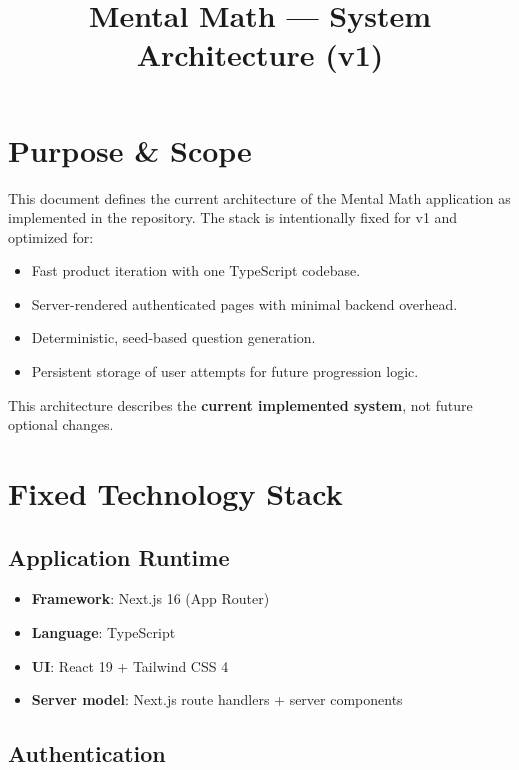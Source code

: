 \documentclass[11pt]{article}
\title{Mental Math --- System Architecture (v1)}
\date{}
\begin{document}
\maketitle

\section{Purpose \& Scope}

This document defines the current architecture of the Mental Math application as implemented in the repository.
The stack is intentionally fixed for v1 and optimized for:

\begin{itemize}[leftmargin=*]
	\item Fast product iteration with one TypeScript codebase.
	\item Server-rendered authenticated pages with minimal backend overhead.
	\item Deterministic, seed-based question generation.
	\item Persistent storage of user attempts for future progression logic.
\end{itemize}

This architecture describes the \textbf{current implemented system}, not future optional changes.

\section{Fixed Technology Stack}

\subsection*{Application Runtime}

\begin{itemize}[leftmargin=*]
	\item \textbf{Framework}: Next.js 16 (App Router)
	\item \textbf{Language}: TypeScript
	\item \textbf{UI}: React 19 + Tailwind CSS 4
	\item \textbf{Server model}: Next.js route handlers + server components
\end{itemize}

\subsection*{Authentication}
\end{document}

